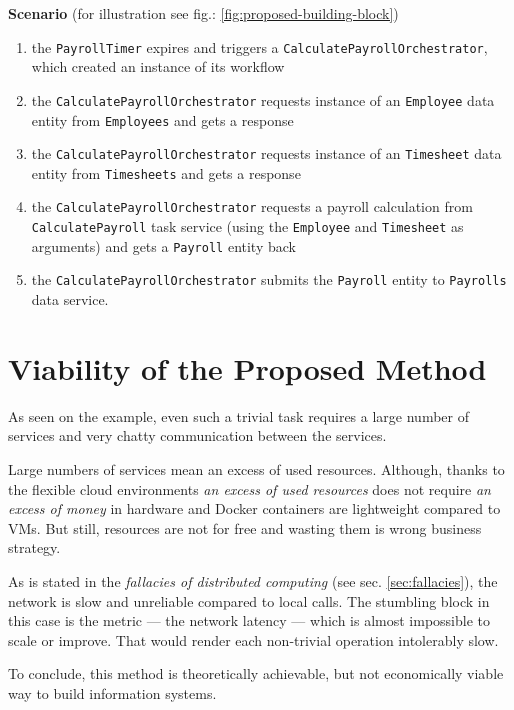 \documentclass[thesis=M,english,hidelinks]{FITthesis}[2012/10/20]
\begin{document}
\break

\noindent
\textbf{Scenario} (for illustration see fig.: \ref{fig:proposed-building-block})
\begin{enumerate}
    \item the \texttt{PayrollTimer} expires and triggers a \texttt{CalculatePayrollOrchestrator}, which created an instance of its workflow
    \item the \texttt{CalculatePayrollOrchestrator} requests instance of an \texttt{Employee} data entity from \texttt{Employees} and gets a response
    \item the \texttt{CalculatePayrollOrchestrator} requests instance of an \texttt{Timesheet} data entity from \texttt{Timesheets} and gets a response
    \item the \texttt{CalculatePayrollOrchestrator} requests a payroll calculation from \texttt{CalculatePayroll} task service (using the \texttt{Employee} and \texttt{Timesheet} as arguments) and gets a \texttt{Payroll} entity back
    \item the \texttt{CalculatePayrollOrchestrator} submits the \texttt{Payroll} entity to \texttt{Payrolls} data service. 
\end{enumerate}

\section{Viability of the Proposed Method}
As seen on the example, even such a trivial task requires a large number of services and very chatty communication between the services.

Large numbers of services mean an excess of used resources. Although, thanks to the flexible cloud environments \textit{an excess of used resources} does not require \textit{an excess of money} in hardware and Docker containers are lightweight compared to \acrshort{VM}s. But still, resources are not for free and wasting them is wrong business strategy.

As is stated in the \textit{fallacies of distributed computing} (see sec. \ref{sec:fallacies}), the network is slow and unreliable compared to local calls. The stumbling block in this case is the metric --- the network latency --- which is almost impossible to scale or improve. That would render each non-trivial operation intolerably slow.

To conclude, this method is theoretically achievable, but not economically viable way to build information systems.
\end{document}
